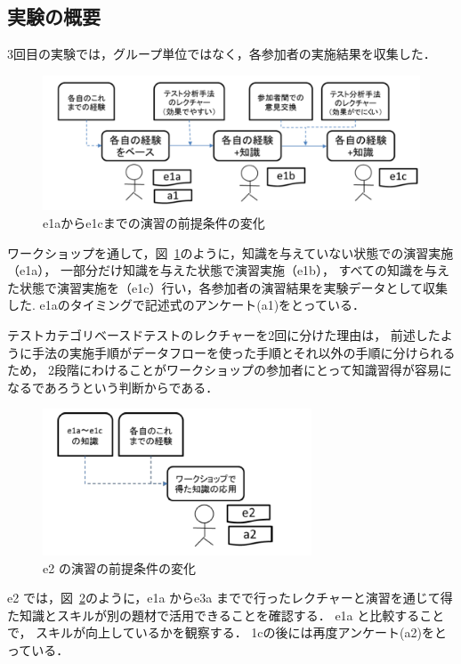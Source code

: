 \subsection{実験の概要}
3回目の実験では，グループ単位ではなく，各参加者の実施結果を収集した\cite{yumoto2016ICST}．
\begin{figure}[h]
\begin{center}
\includegraphics[width=12cm]{./image/D-3-Fig8.png}
\caption{e1aからe1cまでの演習の前提条件の変化}
\label{fig:D-3-Fig8}
\end{center}
\end{figure}
ワークショップを通して，図~\ref{fig:D-3-Fig8}のように，知識を与えていない状態での演習実施（e1a），
一部分だけ知識を与えた状態で演習実施（e1b），
すべての知識を与えた状態で演習実施を（e1c）行い，各参加者の演習結果を実験データとして収集した.
e1aのタイミングで記述式のアンケート(a1)をとっている．

テストカテゴリベースドテストのレクチャーを2回に分けた理由は， 前述したように手法の実施手順がデータフローを使った手順とそれ以外の手順に分けられるため， 2段階にわけることがワークショップの参加者にとって知識習得が容易になるであろうという判断からである．

\begin{figure}[h]
\begin{center}
\includegraphics[width=8cm]{./image/D-3-Fig9.png}
\caption{e2 の演習の前提条件の変化}
\label{fig:D-3-Fig9}
\end{center}
\end{figure}
e2 では，図~\ref{fig:D-3-Fig9}のように，e1a からe3a までで行ったレクチャーと演習を通じて得た知識とスキルが別の題材で活用できることを確認する． e1a と比較することで， スキルが向上しているかを観察する．
1cの後には再度アンケート(a2)をとっている．

